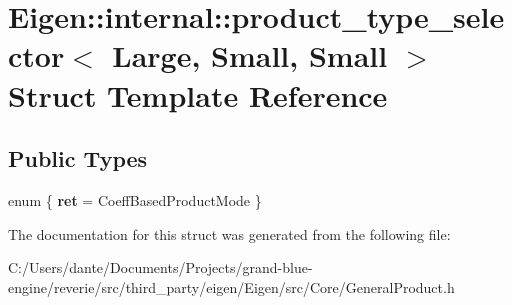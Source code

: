 \hypertarget{struct_eigen_1_1internal_1_1product__type__selector_3_01_large_00_01_small_00_01_small_01_4}{}\section{Eigen\+::internal\+::product\+\_\+type\+\_\+selector$<$ Large, Small, Small $>$ Struct Template Reference}
\label{struct_eigen_1_1internal_1_1product__type__selector_3_01_large_00_01_small_00_01_small_01_4}
\subsection*{Public Types}
\begin{DoxyCompactItemize}
\item 
\mbox{\label{struct_eigen_1_1internal_1_1product__type__selector_3_01_large_00_01_small_00_01_small_01_4_a8e1abd0397519d9dbf6a70fd39b751cd}} 
enum \{ {\bfseries ret} = Coeff\+Based\+Product\+Mode
 \}
\end{DoxyCompactItemize}


The documentation for this struct was generated from the following file\+:\begin{DoxyCompactItemize}
\item 
C\+:/\+Users/dante/\+Documents/\+Projects/grand-\/blue-\/engine/reverie/src/third\+\_\+party/eigen/\+Eigen/src/\+Core/General\+Product.\+h\end{DoxyCompactItemize}
